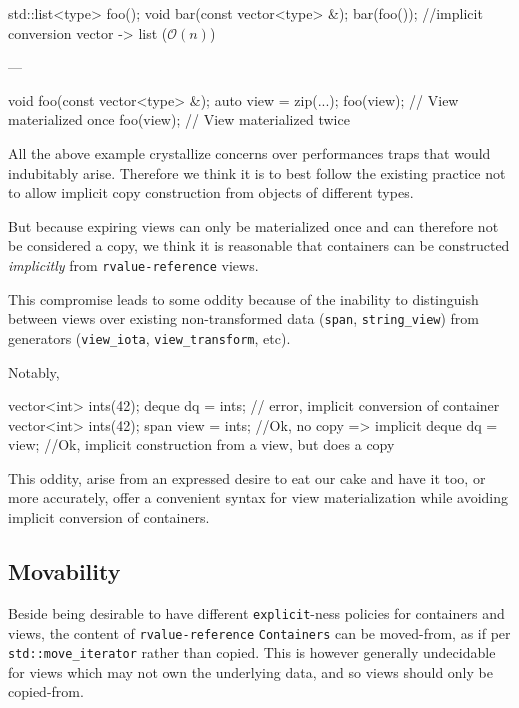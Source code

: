 \documentclass{wg21}
\newcommand{\cc}[1]{\texttt{#1}}
\begin{document}
\begin{codeblock}
    std::list<type> foo();
    void bar(const vector<type> &);
    bar(foo()); //implicit conversion vector -> list ($\mathcal{O}(n)$)
\end{codeblock}
---

\begin{codeblock}
    void foo(const vector<type> &);
    auto view = zip(...);
    foo(view); // View materialized once
    foo(view); // View materialized twice
\end{codeblock}

All the above example crystallize concerns over performances traps that would indubitably arise.
Therefore we think it is to best follow the existing practice not to allow implicit copy construction from objects of different types.

But because expiring views can only be materialized once and can therefore not be considered a copy, we think it is reasonable that
containers can be constructed \emph{implicitly} from \cc{rvalue-reference} views.

This compromise leads to some oddity because of the inability to distinguish between views over existing
non-transformed data (\cc{span}, \cc{string_view}) from generators (\cc{view_iota}, \cc{view_transform}, etc).

Notably,

\begin{codeblock}
{
    vector<int> ints(42);
    deque dq = ints; // error, implicit conversion of container
}
{
    vector<int> ints(42);
    span view = ints; //Ok, no copy => implicit
    deque dq = view;  //Ok, implicit construction from a view, but does a copy
}
\end{codeblock}

This oddity, arise from an expressed desire to eat our cake and have it too, or more accurately, offer a convenient syntax for view materialization while avoiding implicit conversion of containers.

\subsection{Movability}

Beside being desirable to have different \cc{explicit}-ness policies for containers and views, the content of \cc{rvalue-reference} \cc{Containers}
can be moved-from, as if per \cc{std::move_iterator} rather than copied.
This is however generally undecidable for views which may not own the underlying data, and so views should only be copied-from.
\end{document}
